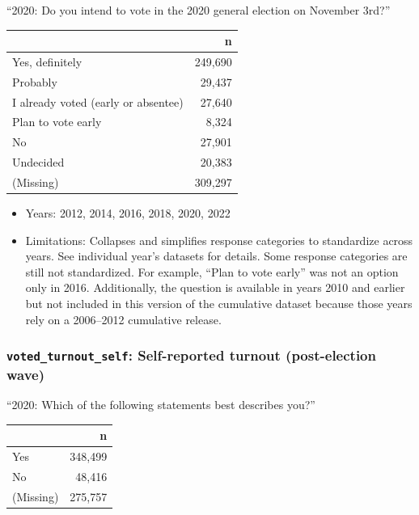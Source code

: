 \documentclass[10pt,article,oneside]{memoir}
\theoremstyle{definition}
\begin{document}
``2020: Do you intend to vote in the 2020 general election on November
3rd?''

\begin{table}[H]
\centering
\begin{tabular}[t]{lr}
\toprule
 & n\\
\midrule
Yes, definitely & 249,690\\
Probably & 29,437\\
I already voted (early or absentee) & 27,640\\
Plan to vote early & 8,324\\
No & 27,901\\
Undecided & 20,383\\
(Missing) & 309,297\\
\bottomrule
\end{tabular}
\end{table}

\begin{itemize}
\tightlist
\item
  Years: 2012, 2014, 2016, 2018, 2020, 2022
\item
  Limitations: Collapses and simplifies response categories to
  standardize across years. See individual year's datasets for details.
  Some response categories are still not standardized. For example,
  ``Plan to vote early'' was not an option only in 2016. Additionally,
  the question is available in years 2010 and earlier but not included
  in this version of the cumulative dataset because those years rely on
  a 2006--2012 cumulative release.
\end{itemize}

\subsubsection{\texorpdfstring{\texttt{voted\_turnout\_self}:
Self-reported turnout (post-election
wave)}{voted\_turnout\_self: Self-reported turnout (post-election wave)}}\label{voted_turnout_self-self-reported-turnout-post-election-wave}

``2020: Which of the following statements best describes you?''

\begin{table}[H]
\centering
\begin{tabular}[t]{lr}
\toprule
 & n\\
\midrule
Yes & 348,499\\
No & 48,416\\
(Missing) & 275,757\\
\bottomrule
\end{tabular}
\end{table}
\end{document}
